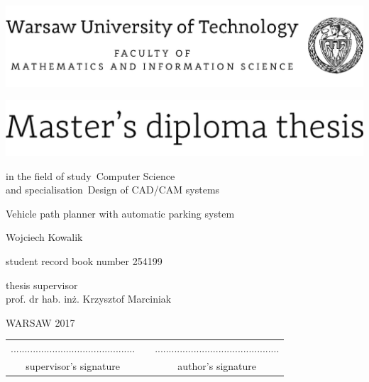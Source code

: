 \documentclass[12pt,twoside,a4paper]{article}
\newcommand{\discipline}{Computer Science}
\newcommand{\spec}{Design of CAD/CAM systems}
\renewcommand{\title}{Vehicle path planner with automatic parking system}
\renewcommand{\author}{Wojciech Kowalik}
\newcommand{\supervisor}{prof. dr hab. inż. Krzysztof Marciniak}
\newcommand{\album}{254199}
\renewcommand{\year}{2017}
\begin{document}
\pagestyle{empty}


\begin{center}
\includegraphics[scale=1.]{wut}
\vspace{70pt}


\includegraphics[scale=1.]{master} %

{ \arial
in the field of study~\discipline \\
and specialisation~\spec

\vspace{30pt}
{\arial \large \title}

\vspace{50pt}

{\arial \huge \author}

\vspace{5pt}

student record book number \album

\vspace{40pt}

thesis supervisor \\
{\arial \supervisor}

\vspace{15pt}
 

 \vfill
WARSAW \year \\
}
\end{center}


\newpage
\null

\vfill

\begin{center}
\begin{tabular}[t]{ccc}
............................................. & \hspace*{100pt} & .............................................\\
supervisor's signature & \hspace*{100pt} & author's signature
\end{tabular}
\end{center}
\end{document}
